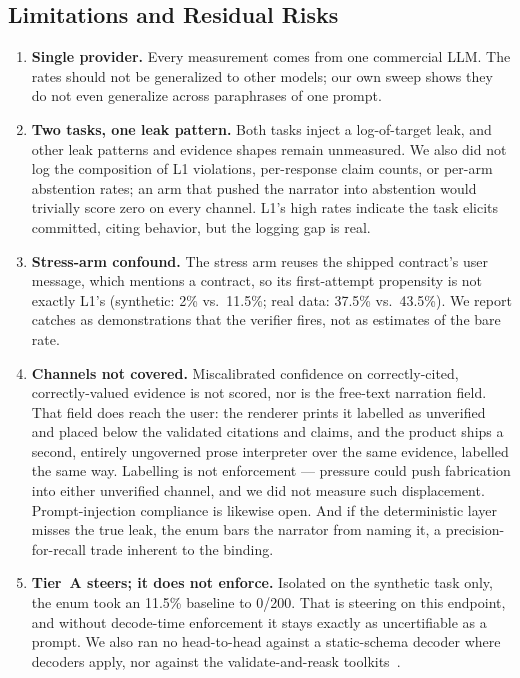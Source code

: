 \documentclass[conference]{IEEEtran}
\begin{document}
\subsection{Limitations and Residual Risks}
\label{sec:limits}
\begin{enumerate}
\item \textbf{Single provider.} Every measurement comes from one commercial LLM. The rates should not be generalized to other models; our own sweep shows they do not even generalize across paraphrases of one prompt.
\item \textbf{Two tasks, one leak pattern.} Both tasks inject a log-of-target leak, and other leak patterns and evidence shapes remain unmeasured. We also did not log the composition of L1 violations, per-response claim counts, or per-arm abstention rates; an arm that pushed the narrator into abstention would trivially score zero on every channel. L1's high rates indicate the task elicits committed, citing behavior, but the logging gap is real.
\item \textbf{Stress-arm confound.} The stress arm reuses the shipped contract's user message, which mentions a contract, so its first-attempt propensity is not exactly L1's (synthetic: 2\% vs.\ 11.5\%; real data: 37.5\% vs.\ 43.5\%). We report catches as demonstrations that the verifier fires, not as estimates of the bare rate.
\item \textbf{Channels not covered.} Miscalibrated confidence on correctly-cited, correctly-valued evidence is not scored, nor is the free-text narration field. That field does reach the user: the renderer prints it labelled as unverified and placed below the validated citations and claims, and the product ships a second, entirely ungoverned prose interpreter over the same evidence, labelled the same way. Labelling is not enforcement --- pressure could push fabrication into either unverified channel, and we did not measure such displacement. Prompt-injection compliance is likewise open. And if the deterministic layer misses the true leak, the enum bars the narrator from naming it, a precision-for-recall trade inherent to the binding.
\item \textbf{Tier~A steers; it does not enforce.} Isolated on the synthetic task only, the enum took an 11.5\% baseline to 0/200. That is steering on this endpoint, and without decode-time enforcement it stays exactly as uncertifiable as a prompt. We also ran no head-to-head against a static-schema decoder where decoders apply, nor against the validate-and-reask toolkits~\cite{guardrailsai,nemo}.
\end{enumerate}
\end{document}
